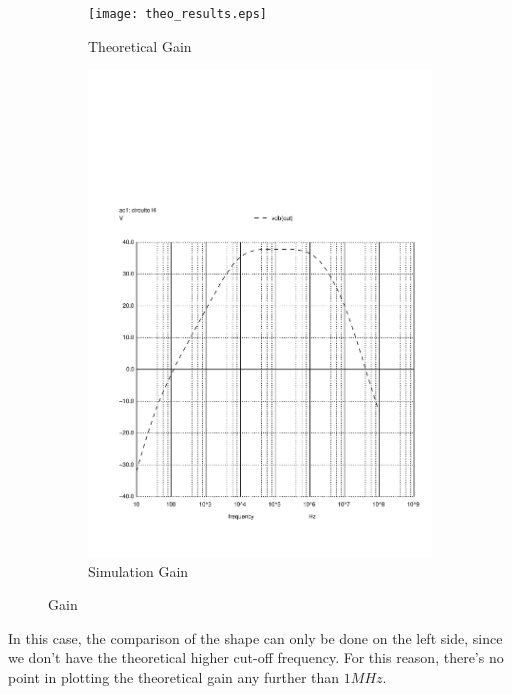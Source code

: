 \begin{figure}[h]
\centering
\begin{subfigure}{.5\textwidth}
    \centering
    \vspace{2.8 cm}
    \texttt{[image: theo\_results.eps]}
    \caption{Theoretical Gain}
\end{subfigure}%
\begin{subfigure}{.5\textwidth}
    \centering
    \includegraphics[scale=0.33]{vo2f.pdf}
    \caption{Simulation Gain}
\end{subfigure}
\caption{Gain}
\label{fig:Gain}
\end{figure}

In this case, the comparison of the shape can only be done on the left side, since we don't have the theoretical higher cut-off frequency. For this reason, there's no point in plotting the theoretical gain any further than $1 MHz$.

